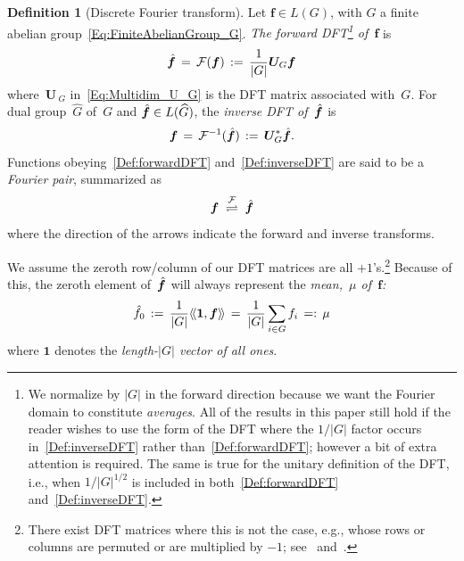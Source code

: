 \documentclass[letterpaper,11pt]{article}
\newcommand{\bs}[1]{{\boldsymbol{#1}}}
\newcommand{\gr}[1]{( #1 )}
\newcommand{\abs}[1]{\vert #1 \vert}
\newcommand{\F}{\mathcal{F}}
\newcommand{\dotprod}[2]{\langle\!\langle #1, #2 \rangle\!\rangle}
\newcommand{\hatbsf}{{\kern+0.25em}\hat{{\kern-0.25em}\bs{f}}}
\theoremstyle{definition} \newtheorem{remark}{Remark}
\newtheorem{definition}{Definition}[section]
\begin{document}
\begin{definition}[Discrete Fourier transform] \label{Def:DFT}
Let $\bs{f} \in L\gr{G}$, with $G$ a finite abelian group~\eqref{Eq:FiniteAbelianGroup_G}. \emph{The forward DFT\footnote{We normalize by $\abs{G}$ in the forward direction because we want the Fourier domain to constitute \emph{averages}. All of the results in this paper still hold if the reader wishes to use the form of the DFT where the $1/\abs{G}$ factor occurs in~\eqref{Def:inverseDFT} rather than~\eqref{Def:forwardDFT}; however a bit of extra attention is required. The same is true for the unitary definition of the DFT, i.e., when $1/\abs{G}^{1/2}$ is included in both~\eqref{Def:forwardDFT} and~\eqref{Def:inverseDFT}.} of~$\bs{f}$} is
\begin{equation} \label{Def:forwardDFT}
\hatbsf \,=\, \F\gr{\bs{f}} \,:=\, \frac{1}{\abs{G}} \bs{U}_{\:\!\!G} \bs{f}
\end{equation}
where~$\bs{U}_{\:\!\!G}$ in~\eqref{Eq:Multidim_U_G} is the DFT matrix associated with~$G$. For dual group~$\widehat{G}$ of~$G$ and $\hatbsf \in L\gr{\widehat{G}}$, the \emph{inverse DFT of~$\hatbsf$} is
\begin{equation} \label{Def:inverseDFT}
\bs{f} \,=\, \F^{-1}\gr{\hatbsf} \,:=\,  \bs{U}_{\:\!\!G}^* \hatbsf.
\end{equation}
Functions obeying~\eqref{Def:forwardDFT} and~\eqref{Def:inverseDFT} are said to be a \emph{Fourier pair}, summarized as
\begin{equation} \label{Def:F-pair}
\bs{f} \;\stackrel{\mathcal{F}}\rightleftharpoons\; \hatbsf
\end{equation}
where the direction of the arrows indicate the forward and inverse transforms.
\end{definition}

We assume the zeroth row/column of our DFT matrices are all $+1$'s.\footnote{There exist DFT matrices where this is not the case, e.g., whose rows or columns are permuted or are multiplied by $-1$; see~\cite[Def.~2.12]{Horadam_HadamardMatrices} and~\cite[Eq.~(13)]{somma2016quantumSimulations}.} Because of this, the zeroth element of~$\hatbsf$  will always represent the \emph{mean,~$\mu$ of~$\bs{f}$:}
\begin{equation} \label{Eq:hat{f}=mu}
\hat{f}_0 \,:=\, \frac{1}{\abs{G}} \dotprod{\bs{1}}{\bs{f}} \,=\, \frac{1}{\abs{G}} \sum_{i\in G} f_i \,=:\, \mu
\end{equation}
where $\bs{1}$ denotes the \emph{length-$\abs{G}$ vector of all ones}.
\end{document}
